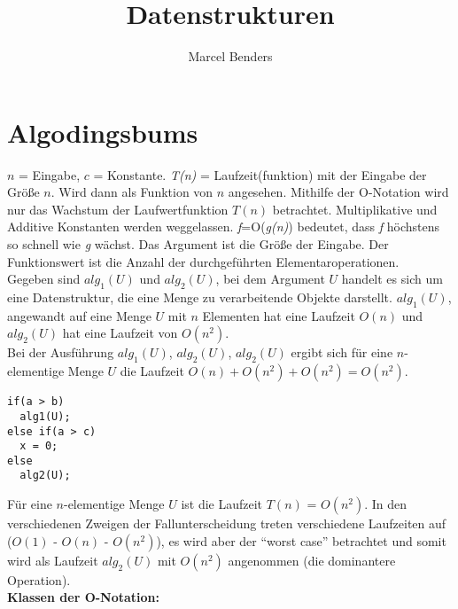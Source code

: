 \documentclass[12pt, twoside]{article}
\begin{document}
\title{Datenstrukturen}
\author{Marcel Benders}
\maketitle
\newpage

\section{Algodingsbums}

$n$ = Eingabe, $c$ = Konstante.
\textit{T(n)} = Laufzeit(funktion) mit der Eingabe der Größe $n$. Wird dann als Funktion von $n$ angesehen. Mithilfe der O-Notation wird nur das Wachstum der Laufwertfunktion $T(n)$ betrachtet. Multiplikative und Additive Konstanten werden weggelassen. \textit{f}=O(\textit{g(n)}) bedeutet, dass \textit{f} höchstens so schnell wie \textit{g} wächst. Das Argument ist die Größe der Eingabe. Der Funktionswert ist die Anzahl der durchgeführten Elementaroperationen.\\

Gegeben sind $alg_1(U)$ und $alg_2(U)$, bei dem Argument $U$ handelt es sich um eine Datenstruktur, die eine Menge zu verarbeitende Objekte darstellt.  $alg_1(U)$, angewandt auf eine Menge $U$ mit $n$ Elementen hat eine Laufzeit $O(n)$ und $alg_2(U)$ hat eine Laufzeit von $O(n^2)$.\\

Bei der Ausführung $alg_1(U)$, $alg_2(U)$, $alg_2(U)$ ergibt sich für eine $n$-elementige Menge $U$ die Laufzeit $O(n) + O(n^2) + O(n^2) = O(n^2)$.\\

\begin{lstlisting}[frame=single]
if(a > b)
  alg1(U);
else if(a > c)
  x = 0;
else
  alg2(U);
\end{lstlisting}

Für eine $n$-elementige Menge $U$ ist die Laufzeit $T(n)$ = $O(n^2)$. In den verschiedenen Zweigen der Fallunterscheidung treten verschiedene Laufzeiten auf ($O(1)$ - $O(n)$ -  $O(n^2)$), es wird aber der "`worst case"' betrachtet und somit wird als Laufzeit $alg_2(U)$ mit $O(n^2)$ angenommen (die dominantere Operation).\\

\textbf{Klassen der O-Notation:}\\
\end{document}
